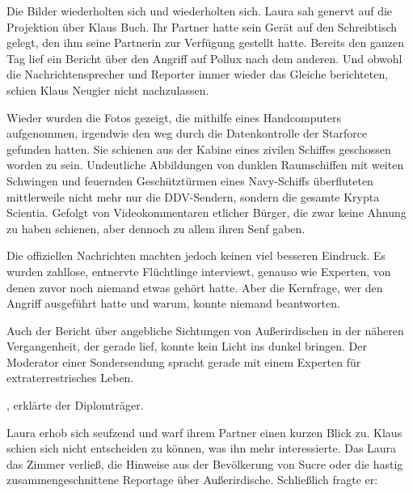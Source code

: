 Die Bilder wiederholten sich und wiederholten sich. Laura sah genervt auf die Projektion über Klaus Buch. Ihr Partner hatte sein Gerät auf den Schreibtisch gelegt, den ihm seine Partnerin zur Verfügung gestellt hatte. Bereits den ganzen Tag lief ein Bericht über den Angriff auf Pollux nach dem anderen. Und obwohl die Nachrichtensprecher und Reporter immer wieder das Gleiche berichteten, schien Klaus Neugier nicht nachzulassen.

\par

Wieder wurden die Fotos gezeigt, die mithilfe eines Handcomputers aufgenommen, irgendwie den weg durch die Datenkontrolle der Starforce gefunden hatten. Sie schienen aus der Kabine eines zivilen Schiffes geschossen worden zu sein. Undeutliche Abbildungen von dunklen Raumschiffen mit weiten Schwingen und feuernden Geschütztürmen eines Navy-Schiffs überfluteten mittlerweile nicht mehr nur die DDV-Sendern, sondern die gesamte Krypta Scientia. Gefolgt von Videokommentaren etlicher Bürger, die zwar keine Ahnung zu haben schienen, aber dennoch zu allem ihren Senf gaben.

\par

Die offiziellen Nachrichten machten jedoch keinen viel besseren Eindruck. Es wurden zahllose, entnervte Flüchtlinge interviewt, genauso wie Experten, von denen zuvor noch niemand etwas gehört hatte. Aber die Kernfrage, wer den Angriff ausgeführt hatte und warum, konnte niemand beantworten.

\par

Auch der Bericht über angebliche Sichtungen von Außerirdischen in der näheren Vergangenheit, der gerade lief, konnte kein Licht ins dunkel bringen. Der Moderator einer Sondersendung spracht gerade mit einem Experten für extraterrestrisches Leben.

\par

, erklärte der Diplomträger. 

\par

Laura erhob sich seufzend und warf ihrem Partner einen kurzen Blick zu. Klaus schien sich nicht entscheiden zu können, was ihn mehr interessierte. Das Laura das Zimmer verließ, die Hinweise aus der Bevölkerung von Sucre oder die hastig zusammengeschnittene Reportage über Außerirdische. Schließlich fragte er: 

